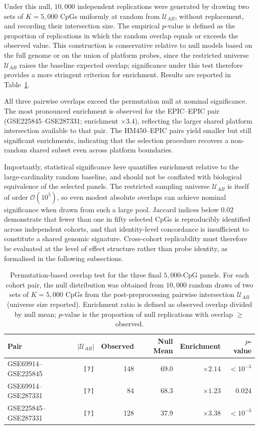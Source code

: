 Under this null, $10{,}000$ independent replications were generated
by drawing two sets of $K = 5{,}000$ CpGs uniformly at random from
$\mathcal{U}_{AB}$, without replacement, and recording their
intersection size.
The empirical $p$-value is defined as the proportion of replications
in which the random overlap equals or exceeds the observed value.
This construction is conservative relative to null models based on
the full genome or on the union of platform probes, since the
restricted universe $\mathcal{U}_{AB}$ raises the baseline expected
overlap; significance under this test therefore provides a more
stringent criterion for enrichment.
Results are reported in Table~\ref{tab:interfs_overlap}.

All three pairwise overlaps exceed the permutation null at nominal
significance.
The most pronounced enrichment is observed for the EPIC--EPIC pair
(GSE225845--GSE287331; enrichment $\times 3.4$), reflecting the
larger shared platform intersection available to that pair.
The HM$450$--EPIC pairs yield smaller but still significant
enrichments, indicating that the selection procedure recovers a
non-random shared subset even across platform boundaries.

Importantly, statistical significance here quantifies enrichment
relative to the large-cardinality random baseline, and should not
be conflated with biological equivalence of the selected panels.
The restricted sampling universe $\mathcal{U}_{AB}$ is itself of
order $\mathcal{O}(10^5)$, so even modest absolute overlaps can
achieve nominal significance when drawn from such a large pool.
Jaccard indices below $0.02$ demonstrate that fewer than one in
fifty selected CpGs is reproducibly identified across independent
cohorts, and that identity-level concordance is insufficient to
constitute a shared genomic signature.
Cross-cohort replicability must therefore be evaluated at the level
of effect structure rather than probe identity, as formalised in
the following subsections.

\begin{table}[t]
\centering
\small
\caption{%
  Permutation-based overlap test for the three final $5{,}000$-CpG
  panels. For each cohort pair, the null distribution was obtained
  from $10{,}000$ random draws of two sets of $K{=}5{,}000$ CpGs
  from the post-preprocessing pairwise intersection
  $\mathcal{U}_{AB}$ (universe size reported).
  Enrichment ratio is defined as observed overlap divided by null
  mean; $p$-value is the proportion of null replications with
  overlap $\geq$ observed.
}
\label{tab:interfs_overlap}
\begin{tabular}{l r r r r r}
\toprule
Pair & $|\mathcal{U}_{AB}|$ & Observed & Null Mean
     & Enrichment & $p$-value \\
\midrule
GSE69914--GSE225845  & \texttt{[?]} & 148 & 69.0
    & $\times 2.14$ & $< 10^{-3}$ \\
GSE69914--GSE287331  & \texttt{[?]} &  84 & 68.3
    & $\times 1.23$ & $0.024$     \\
GSE225845--GSE287331 & \texttt{[?]} & 128 & 37.9
    & $\times 3.38$ & $< 10^{-3}$ \\
\bottomrule
\end{tabular}
\end{table}

